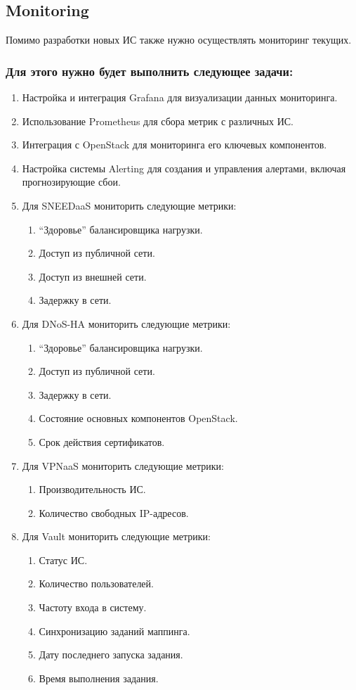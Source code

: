 \documentclass[14pt, a4paper]{extarticle}
\begin{document}
\subsection{Monitoring}

Помимо разработки новых ИС также нужно осуществлять мониторинг текущих.

\subsubsection*{Для этого нужно будет выполнить следующее задачи:}

\begin{enumerate}
\item Настройка и интеграция Grafana для визуализации данных мониторинга.
\item Использование Prometheus для сбора метрик с различных ИС.
\item Интеграция с OpenStack для мониторинга его ключевых компонентов.
\item Настройка системы Alerting для создания и управления алертами, включая прогнозирующие сбои.
\item Для SNEEDaaS мониторить следующие метрики:
    \begin{enumerate}
    \item “Здоровье” балансировщика нагрузки.
    \item Доступ из публичной сети.
    \item Доступ из внешней сети.
    \item Задержку в сети.
    \end{enumerate}
\item Для DNoS-HA мониторить следующие метрики:
    \begin{enumerate}
    \item “Здоровье” балансировщика нагрузки.
    \item Доступ из публичной сети.
    \item Задержку в сети.
    \item Состояние основных компонентов OpenStack.
    \item Срок действия сертификатов.
    \end{enumerate}
\item Для VPNaaS мониторить следующие метрики:
    \begin{enumerate}
    \item Производительность ИС.
    \item Количество свободных IP-адресов.
    \end{enumerate}
\item Для Vault мониторить следующие метрики:
    \begin{enumerate}
    \item Статус ИС.
    \item Количество пользователей.
    \item Частоту входа в систему.
    \item Синхронизацию заданий маппинга.
    \item Дату последнего запуска задания.
    \item Время выполнения задания.
    \end{enumerate}
\end{enumerate}
\end{document}
